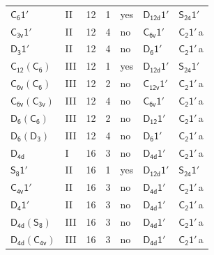 \documentclass[10pt,a4paper]{article}
\numberwithin{equation}{section}
\newcommand{\grp}[1]{\mathsf{#1}}
\newcommand{\clsletter}[1]{\,{\scriptsize\color{black!55}#1}}
\begin{document}
{\begin{longtable}{@{}llrrlll@{}}
\href{C6-1p.pdf}{$\grp{C_{6}1'}$} & II & 12 & 1 & yes & \href{D12d-1p.pdf}{$\grp{D_{12d}1'}$} & \href{S24-1p.pdf}{$\grp{S_{24}1'}$}\\
\href{C3v-1p.pdf}{$\grp{C_{3v}1'}$} & II & 12 & 4 & no & \href{C6v-1p.pdf}{$\grp{C_{6v}1'}$} & \href{C2-1p.pdf}{$\grp{C_{2}1'}$}\clsletter{a}\\
\href{D3-1p.pdf}{$\grp{D_{3}1'}$} & II & 12 & 4 & no & \href{D6-1p.pdf}{$\grp{D_{6}1'}$} & \href{C2-1p.pdf}{$\grp{C_{2}1'}$}\clsletter{a}\\
\href{C12-C6.pdf}{$\grp{C_{12}}(\grp{C_{6}})$} & III & 12 & 1 & yes & \href{D12d-1p.pdf}{$\grp{D_{12d}1'}$} & \href{S24-1p.pdf}{$\grp{S_{24}1'}$}\\
\href{C6v-C6.pdf}{$\grp{C_{6v}}(\grp{C_{6}})$} & III & 12 & 2 & no & \href{C12v-1p.pdf}{$\grp{C_{12v}1'}$} & \href{C2-1p.pdf}{$\grp{C_{2}1'}$}\clsletter{a}\\
\href{C6v-C3v.pdf}{$\grp{C_{6v}}(\grp{C_{3v}})$} & III & 12 & 4 & no & \href{C6v-1p.pdf}{$\grp{C_{6v}1'}$} & \href{C2-1p.pdf}{$\grp{C_{2}1'}$}\clsletter{a}\\
\href{D6-C6.pdf}{$\grp{D_{6}}(\grp{C_{6}})$} & III & 12 & 2 & no & \href{D12-1p.pdf}{$\grp{D_{12}1'}$} & \href{C2-1p.pdf}{$\grp{C_{2}1'}$}\clsletter{a}\\
\href{D6-D3.pdf}{$\grp{D_{6}}(\grp{D_{3}})$} & III & 12 & 4 & no & \href{D6-1p.pdf}{$\grp{D_{6}1'}$} & \href{C2-1p.pdf}{$\grp{C_{2}1'}$}\clsletter{a}\\
\href{../../../rotation/data/pdf/D4d.pdf}{$\grp{D_{4d}}$} & I & 16 & 3 & no & \href{D4d-1p.pdf}{$\grp{D_{4d}1'}$} & \href{C2-1p.pdf}{$\grp{C_{2}1'}$}\clsletter{a}\\
\href{S8-1p.pdf}{$\grp{S_{8}1'}$} & II & 16 & 1 & yes & \href{D12d-1p.pdf}{$\grp{D_{12d}1'}$} & \href{S24-1p.pdf}{$\grp{S_{24}1'}$}\\
\href{C4v-1p.pdf}{$\grp{C_{4v}1'}$} & II & 16 & 3 & no & \href{D4d-1p.pdf}{$\grp{D_{4d}1'}$} & \href{C2-1p.pdf}{$\grp{C_{2}1'}$}\clsletter{a}\\
\href{D4-1p.pdf}{$\grp{D_{4}1'}$} & II & 16 & 3 & no & \href{D4d-1p.pdf}{$\grp{D_{4d}1'}$} & \href{C2-1p.pdf}{$\grp{C_{2}1'}$}\clsletter{a}\\
\href{D4d-S8.pdf}{$\grp{D_{4d}}(\grp{S_{8}})$} & III & 16 & 3 & no & \href{D4d-1p.pdf}{$\grp{D_{4d}1'}$} & \href{C2-1p.pdf}{$\grp{C_{2}1'}$}\clsletter{a}\\
\href{D4d-C4v.pdf}{$\grp{D_{4d}}(\grp{C_{4v}})$} & III & 16 & 3 & no & \href{D4d-1p.pdf}{$\grp{D_{4d}1'}$} & \href{C2-1p.pdf}{$\grp{C_{2}1'}$}\clsletter{a}\\

\end{longtable}}
\end{document}
